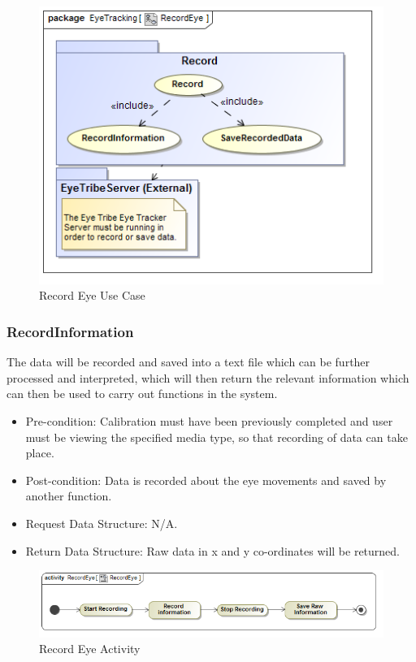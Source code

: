 \begin{figure}[!ht]
	\centering 
	\includegraphics[scale=0.5]{Diagrams/Use_Case_Diagram__RecordEye.png}
	\caption{Record Eye Use Case}
	\label{RecordEye}
	\end{figure}
	
\subsubsection{RecordInformation}
The data will be recorded and saved into a text file which can be further processed and interpreted, which will then return the relevant information which can then be used to carry out functions in the system.
\begin{itemize}
\item Pre-condition: Calibration must have been previously completed and user must be viewing the specified media type, so that recording of data can take place.
\item Post-condition: Data is recorded about the eye movements and saved by another function.
\item Request Data Structure: N/A.
\item Return Data Structure: Raw data in x and y co-ordinates will be returned.
\end{itemize}

\begin{figure}[!ht]
	\centering
	\includegraphics[scale=0.5]{Diagrams/Activity_Diagram__RecordEye__RecordEye.png}
	\caption{Record Eye Activity}
	\end{figure}

